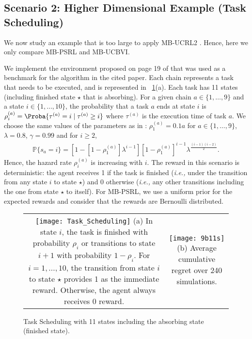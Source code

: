 \begin{subappendices}
\subsection{Scenario 2: Higher Dimensional Example (Task Scheduling)}
\label{sssec:task_scheduling}

We now study an example that is too large to apply MB-UCRL2 . Hence, here we only compare MB-PSRL and MB-UCBVI. 

We implement the environment proposed on page 19 of \cite{duff1995q} that was used as a benchmark for the algorithm in the cited paper. Each chain represents a task that needs to be executed, and is represented in \figurename~\ref{fig:task_scheduling}(a). 
Each task has 11 states (including finished state $\star$ that is absorbing). 
For a given chain $a\in\{1,\dots,9\}$ and a state $i\in\{1,\dots,10\}$, the probability that a task $a$ ends at state $i$ is $\rho^{(a)}_{i}=\Proba{\tau^{(a)}=i \mid\tau^{(a)}\ge i}$ where $\tau^{(a)}$ is the execution time of task $a$. 
We choose the same values of the parameters as in \cite{duff1995q}: $\rho^{(a)}_{1}=0.1a$ for $a\in\{1,\dots,9\}$, $\lambda=0.8$, $\gamma=0.99$ and for $i\ge2$, 
\begin{align*}
    \mathbb{P}\{s_a=i\}=\left[1-[1-\rho^{(a)}_{1}]\lambda^{i-1}\right][1-\rho^{(a)}_{1}]^{i-1}\lambda^{\frac{(i-1)(i-2)}{2}}.
\end{align*}
Hence, the hazard rate $\rho^{(a)}_{i}$ is increasing with $i$. The reward in this scenario is deterministic: the agent receives 1 if the task is finished (\emph{i.e.,} under the transition from any state $i$ to state $\star$) and 0 otherwise (\emph{i.e.,} any other transitions including the one from state $\star$ to itself).
For MB-PSRL, we use a uniform prior for the expected rewards and consider that the rewards are Bernoulli distributed.

\begin{figure}[ht]
    \center
    \begin{tabular}{cc}
        \begin{minipage}{.5\linewidth}
            \texttt{[image: Task\_Scheduling]}
            (a) In state $i$, the task is finished with probability $\rho_i$ or transitions to state $i+1$ with probability $1-\rho_i$. For $i=1,\dots,10$, the transition from state $i$ to state $\star$ provides 1 as the immediate reward. Otherwise, the agent always receives 0 reward.
        \end{minipage}
        &
        \begin{minipage}{.4\linewidth}
            \texttt{[image: 9b11s]}
            (b) Average cumulative regret over 240 simulations.
        \end{minipage}        
    \end{tabular}
    \caption{Task Scheduling with 11 states including the absorbing state (finished state). }
    \label{fig:task_scheduling}
\end{figure}



\end{subappendices}
